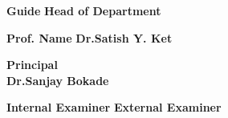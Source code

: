 \textbf {Guide}\vspace{0.20cm}
\hspace{3.7in} \textbf{Head of Department}\\ \hspace*{0cm}

\textbf {Prof. Name} \hspace{3.5in} \textbf{Dr.Satish Y. Ket} \\
\vspace{0.40cm}
 

\begin{center}
\textbf{Principal}\\
\vspace{0.20cm}
\textbf{Dr.Sanjay Bokade}\\
\end{center}
\vspace{0.25cm}
\textbf {Internal Examiner}
\hspace{3.3in} \textbf{External Examiner}\\ 

